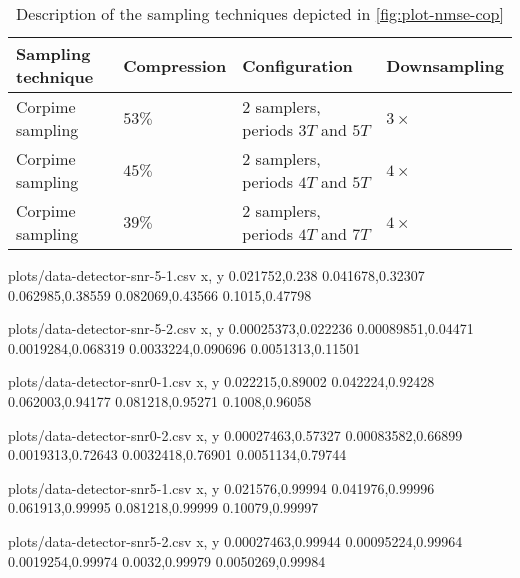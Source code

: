 \documentclass[a4paper, openany, oneside]{memoir}
\begin{document}
\begin{table}
	\centering
	\begin{tabular}{llll}
		\textbf{Sampling technique} & \textbf{Compression} & \textbf{Configuration} & \textbf{Downsampling} \\ \hline
		Corpime sampling & $53\%$ & $2$ samplers, periods $3T$ and $5T$ & $3 \times$ \\
		Corpime sampling & $45\%$ & $2$ samplers, periods $4T$ and $5T$ & $4 \times$ \\
		Corpime sampling & $39\%$ & $2$ samplers, periods $4T$ and $7T$ & $4 \times$ \\
	\end{tabular}
	\caption{Description of the sampling techniques depicted in \cref{fig:plot-nmse-cop}}
	\label{tab:sampling-nmse-cop}
\end{table}





\begin{filecontents*}{plots/data-detector-snr-5-1.csv}
x, y
0.021752,0.238
0.041678,0.32307
0.062985,0.38559
0.082069,0.43566
0.1015,0.47798
\end{filecontents*}
\begin{filecontents*}{plots/data-detector-snr-5-2.csv}
x, y
0.00025373,0.022236
0.00089851,0.04471
0.0019284,0.068319
0.0033224,0.090696
0.0051313,0.11501
\end{filecontents*}
\begin{filecontents*}{plots/data-detector-snr0-1.csv}
x, y
0.022215,0.89002
0.042224,0.92428
0.062003,0.94177
0.081218,0.95271
0.1008,0.96058
\end{filecontents*}
\begin{filecontents*}{plots/data-detector-snr0-2.csv}
x, y
0.00027463,0.57327
0.00083582,0.66899
0.0019313,0.72643
0.0032418,0.76901
0.0051134,0.79744
\end{filecontents*}
\begin{filecontents*}{plots/data-detector-snr5-1.csv}
x, y
0.021576,0.99994
0.041976,0.99996
0.061913,0.99995
0.081218,0.99999
0.10079,0.99997
\end{filecontents*}
\begin{filecontents*}{plots/data-detector-snr5-2.csv}
x, y
0.00027463,0.99944
0.00095224,0.99964
0.0019254,0.99974
0.0032,0.99979
0.0050269,0.99984
\end{filecontents*}
\end{document}
